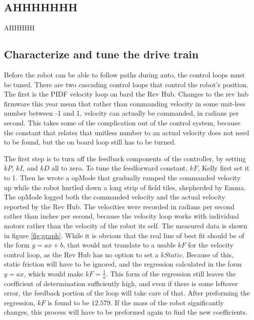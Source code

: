 \documentclass{article}
\begin{document}
\subsection {AHHHHHHH}
AHHHHH

\subsection {Characterize and tune the drive train}

Before the robot can be able to follow paths during auto, the control loops must be tuned. There are two cascading control loops that control the robot's position. The first is the PIDF velocity loop on bard the Rev Hub. Changes to the rev hub firmware this year mean that rather than commanding velocity in some unit-less number between -1 and 1, velocity can actually be commanded, in radians per second. This takes some of the complication out of the control system, because the constant that relates that unitless number to an actual velocity does not need to be found, but the on board loop still has to be turned. 

The first step is to turn off the feedback components of the controller, by setting $kP$, $kI$, and $kD$ all to zero. To tune the feedforward constant, $kF$, Kelly first set it to 1. Then he wrote a opMode that gradually ramped the commanded velocity up while the robot hurtled down a long strip of field tiles, shepherded by Emma. The opMode logged both the commanded velocity and the actual velocity reported by the Rev Hub. The velocities were recorded in radians per second rather than inches per second, because the velocity loop works with individual motors rather than the velocity of the robot its self. The measured data is shown in figure \ref{fig:graph}. While it is obvious that the real line of best fit should be of the form $y=ax+b$, that would not translate to a usable $kF$ for the velocity control loop, as the Rev Hub has no option to set a $kStatic$. Because of this, static friction will have to be ignored, and the regression calculated in the form $y=ax$, which would make $kF = \frac{1}{a}$. This form of the regression still leaves the coefficient of determination sufficiently high, and even if there is some leftover error, the feedback portion of the loop will take care of that. After preforming the regression, $kF$ is found to be $12.579$. If the mass of the robot significantly changes, this process will have to be preformed again to find the new coefficients.
\end{document}
